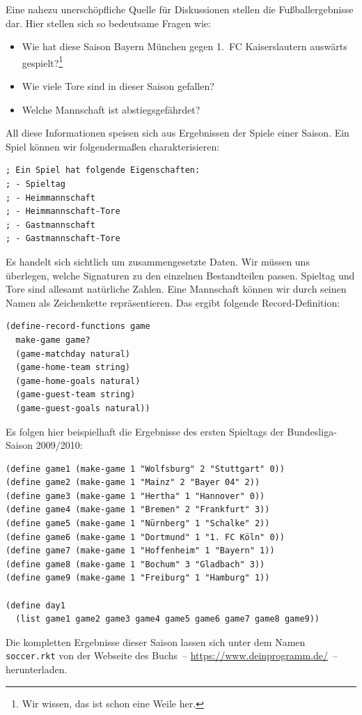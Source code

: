 Eine nahezu unerschöpfliche Quelle für Diskussionen stellen die
Fußballergebnisse dar.  Hier stellen sich so bedeutsame Fragen wie:
\begin{itemize}
\item Wie hat diese Saison Bayern München gegen 1.~FC Kaiserslautern
  auswärts gespielt?\footnote{Wir wissen, das ist schon eine Weile her.}
\item Wie viele Tore sind in dieser Saison gefallen?
\item Welche Mannschaft ist abstiegsgefährdet?
\end{itemize}
%
All diese Informationen speisen sich aus Ergebnissen der Spiele einer
Saison.  Ein Spiel können wir folgendermaßen charakterisieren:
%
\begin{lstlisting}
; Ein Spiel hat folgende Eigenschaften:
; - Spieltag
; - Heimmannschaft
; - Heimmannschaft-Tore
; - Gastmannschaft
; - Gastmannschaft-Tore
\end{lstlisting}
%
Es handelt sich sichtlich um zusammengesetzte Daten.  Wir müssen uns
überlegen, welche Signaturen zu den einzelnen Bestandteilen passen.
Spieltag und Tore sind allesamt natürliche Zahlen.  Eine Mannschaft können
wir durch seinen Namen als Zeichenkette repräsentieren.   Das ergibt
folgende Record-Definition:
\begin{lstlisting}
(define-record-functions game
  make-game game?
  (game-matchday natural)
  (game-home-team string)
  (game-home-goals natural)
  (game-guest-team string)
  (game-guest-goals natural))
\end{lstlisting}
%
Es folgen hier beispielhaft die Ergebnisse des ersten Spieltags der Bundesliga-Saison
2009/2010:
\begin{lstlisting}
(define game1 (make-game 1 "Wolfsburg" 2 "Stuttgart" 0))
(define game2 (make-game 1 "Mainz" 2 "Bayer 04" 2))
(define game3 (make-game 1 "Hertha" 1 "Hannover" 0))
(define game4 (make-game 1 "Bremen" 2 "Frankfurt" 3))
(define game5 (make-game 1 "Nürnberg" 1 "Schalke" 2))
(define game6 (make-game 1 "Dortmund" 1 "1. FC Köln" 0))
(define game7 (make-game 1 "Hoffenheim" 1 "Bayern" 1))
(define game8 (make-game 1 "Bochum" 3 "Gladbach" 3))
(define game9 (make-game 1 "Freiburg" 1 "Hamburg" 1))

(define day1
  (list game1 game2 game3 game4 game5 game6 game7 game8 game9))
\end{lstlisting}
%
Die kompletten Ergebnisse dieser Saison lassen sich unter dem Namen
\texttt{soccer.rkt} von der Webseite des Buchs~--
\url{https://www.deinprogramm.de/}~-- herunterladen.

